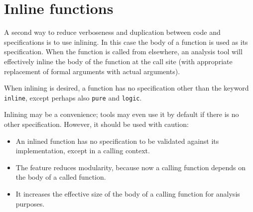 \section{Inline functions}

\experimental

A second way to reduce verboseness and duplication between code and specifications is to use inlining. 
In this case the body of a function is used as its specification. When the function is called from elsewhere,
an analysis tool will effectively inline the body of the function at the call site (with appropriate replacement of formal arguments with actual arguments).

When inlining is desired, a function has no specification other than the keyword \lstinline|inline|, except perhaps also \lstinline|pure| and \lstinline|logic|.

Inlining may be a convenience; tools may even use it by default if there is no other specification. However, it should be used with caution:
\begin{itemize}
	\item An inlined function has no specification to be validated against its implementation, except in a calling context.
	\item The feature reduces modularity, because now a calling function depends on the body of a called function.
	\item It increases the effective size of the body of a calling function for analysis purposes.
\end{itemize}